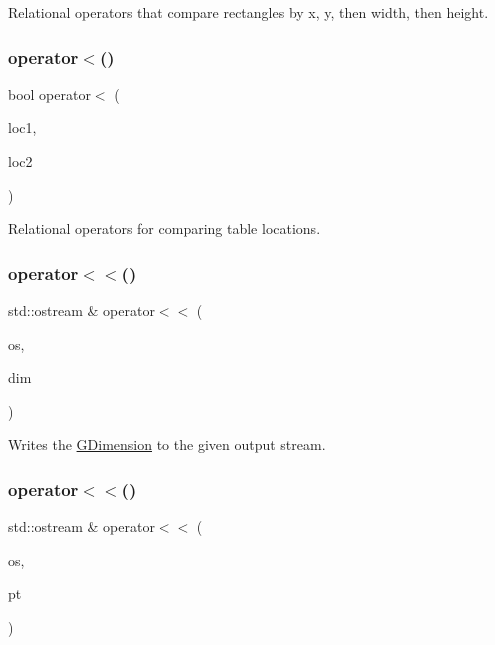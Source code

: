 Relational operators that compare rectangles by x, y, then width, then height. 

\mbox{\label{namespacesgl_ac09b5e33e58f997ad3305078267c5b3b}} 
\subsubsection{\texorpdfstring{operator$<$()}{operator<()}\hspace{0.1cm}{\footnotesize\ttfamily [4/4]}}
{\footnotesize\ttfamily bool operator$<$ (\begin{DoxyParamCaption}\item[{const \mbox{\hyperlink{structsgl_1_1GTableIndex}{G\+Table\+Index}} \&}]{loc1,  }\item[{const \mbox{\hyperlink{structsgl_1_1GTableIndex}{G\+Table\+Index}} \&}]{loc2 }\end{DoxyParamCaption})}



Relational operators for comparing table locations. 

\mbox{\label{namespacesgl_a0dd9f47a185e16b2ed246df865952146}} 
\subsubsection{\texorpdfstring{operator$<$$<$()}{operator<<()}\hspace{0.1cm}{\footnotesize\ttfamily [1/6]}}
{\footnotesize\ttfamily std\+::ostream \& operator$<$$<$ (\begin{DoxyParamCaption}\item[{std\+::ostream \&}]{os,  }\item[{const \mbox{\hyperlink{structsgl_1_1GDimension}{G\+Dimension}} \&}]{dim }\end{DoxyParamCaption})}



Writes the \mbox{\hyperlink{structsgl_1_1GDimension}{G\+Dimension}} to the given output stream. 

\mbox{\label{namespacesgl_a88930ae3830625e1488ced9c22fcdffd}} 
\subsubsection{\texorpdfstring{operator$<$$<$()}{operator<<()}\hspace{0.1cm}{\footnotesize\ttfamily [2/6]}}
{\footnotesize\ttfamily std\+::ostream \& operator$<$$<$ (\begin{DoxyParamCaption}\item[{std\+::ostream \&}]{os,  }\item[{const \mbox{\hyperlink{structsgl_1_1GPoint}{G\+Point}} \&}]{pt }\end{DoxyParamCaption})}




